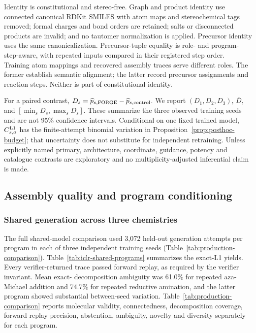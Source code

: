 \documentclass{article}
\theoremstyle{definition}
\newcommand{\ForgeTableOneBLAmbiguityPercent}{61.0}
\newcommand{\ForgeTableOneLXAmbiguityPercent}{74.7}
\newcommand{\ForgeProseAttemptsPerProgram}{3{,}072}
\begin{document}
Identity is constitutional and stereo-free. Graph and product identity use connected canonical RDKit
SMILES with atom maps and stereochemical tags removed; formal charges and bond orders are retained;
salts or disconnected products are invalid; and no tautomer normalization is applied. Precursor
identity uses the same canonicalization. Precursor-tuple equality is role- and program-step-aware,
with repeated inputs compared in their registered step order. Training atom mappings and recovered assembly traces serve different roles. The former establish
semantic alignment; the latter record precursor assignments and reaction steps. Neither is part
of constitutional identity.

For a paired contrast, $D_s=\widehat p_{s,\rm FORGE}-\widehat p_{s,\rm control}$. We report
$(D_1,D_2,D_3)$, $\overline D$, and $[\min_sD_s,\max_sD_s]$. These summarize the three observed
training seeds and are not 95\% confidence intervals. Conditional on one fixed trained model,
$C_{s,a}^{\rm L1}$ has the finite-attempt binomial variation in
Proposition~\ref{prop:posthoc-budget}; that uncertainty does not substitute for independent
retraining. Unless explicitly named primary, architecture, coordinate, guidance, potency and
catalogue contrasts are exploratory and no multiplicity-adjusted inferential claim is made.

\FloatBarrier
\subsection{Assembly quality and program conditioning}
\label{app:assembly-results}

\subsubsection{Shared generation across three chemistries}

The full shared-model comparison used \ForgeProseAttemptsPerProgram{} held-out generation attempts
per program in each of three independent training seeds (Table~\ref{tab:production-comparison}).
Table~\ref{tab:iclr-shared-programs} summarizes the exact-L1 yields.
Every verifier-returned trace passed forward replay, as required by the verifier invariant. Mean exact-
decomposition ambiguity was \ForgeTableOneBLAmbiguityPercent\% for repeated aza-Michael addition
and \ForgeTableOneLXAmbiguityPercent\% for
repeated reductive amination, and the latter program showed substantial between-seed variation.
Table~\ref{tab:production-comparison} reports molecular validity, connectedness, decomposition
coverage, forward-replay precision, abstention, ambiguity, novelty and diversity separately for
each program.
\end{document}
